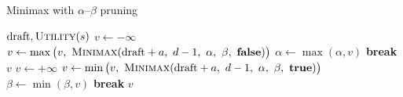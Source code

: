 \documentclass[12pt]{article}
\begin{document}
\newpage
\begin{algorithm}[h!]
\caption{Minimax with $\alpha$–$\beta$ pruning}
\label{alg:alphabeta}
\begin{algorithmic}[1]
        \State \Return $\text{draft}, \textsc{Utility}(s)$
    \EndIf
        \State $v \gets -\infty$
                    \State $v \gets \max\big(v,\ \textsc{Minimax}(\text{draft} + a,\ d-1,\ \alpha,\ \beta,\ \textbf{false})\big)$
                    \State $\alpha \gets \max(\alpha, v)$
                    \If{$\alpha \ge \beta$} \State \textbf{break}
                    \EndIf
                \EndIf
        \EndFor
        \State \Return $v$
    \Else
        \State $v \gets +\infty$
                \State $v \gets \min\big(v,\ \textsc{Minimax}(\text{draft} + a,\ d-1,\ \alpha,\ \beta,\ \textbf{true})\big)$
                \State $\beta \gets \min(\beta, v)$
                \If{$\alpha \ge \beta$} \State \textbf{break}
                \EndIf
            \EndIf
        \EndFor
        \State \Return $v$
    \EndIf
\EndFunction
\end{algorithmic}
\label{alg:minimax}
\end{algorithm}
\end{document}
